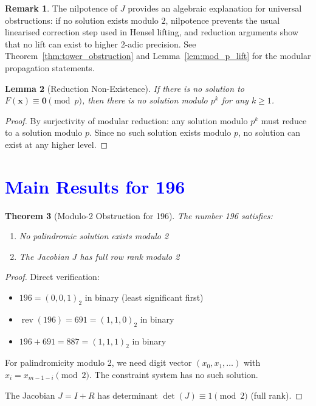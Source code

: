 \documentclass[11pt,a4paper]{article}
\theoremstyle{plain}
\newtheorem{theorem}{Theorem}[section]
\newtheorem{lemma}[theorem]{Lemma}
\theoremstyle{definition}
\newtheorem{remark}[theorem]{Remark}
\DeclareMathOperator{\rev}{rev}
\begin{document}
\begin{remark}
The nilpotence of $J$ provides an algebraic explanation for universal obstructions: if no solution exists modulo $2$, nilpotence prevents the usual linearised correction step used in Hensel lifting, and reduction arguments show that no lift can exist to higher 2-adic precision. See Theorem~\ref{thm:tower_obstruction} and Lemma~\ref{lem:mod_p_lift} for the modular propagation statements.
\end{remark}

\begin{lemma}[Reduction Non-Existence]\label{lem:reduction}
If there is no solution to $F(\mathbf{x}) \equiv \mathbf{0} \pmod{p}$, then there is no solution modulo $p^k$ for any $k \geq 1$.
\end{lemma}

\begin{proof}
By surjectivity of modular reduction: any solution modulo $p^k$ must reduce to a solution modulo $p$. Since no such solution exists modulo $p$, no solution can exist at any higher level.
\end{proof}

\section{\textcolor{blue}{Main Results for 196}}

\begin{theorem}[Modulo-2 Obstruction for 196]\label{thm:mod2_196}
The number 196 satisfies:
\begin{enumerate}
\item No palindromic solution exists modulo 2
\item The Jacobian $J$ has full row rank modulo 2
\end{enumerate}
\end{theorem}

\begin{proof}
Direct verification:
\begin{itemize}
\item $196 = (0, 0, 1)_2$ in binary (least significant first)
\item $\rev(196) = 691 = (1, 1, 0)_2$ in binary
\item $196 + 691 = 887 = (1, 1, 1)_2$ in binary
\end{itemize}

For palindromicity modulo 2, we need digit vector $(x_0, x_1, \ldots)$ with $x_i = x_{m-1-i} \pmod{2}$. The constraint system has no such solution.

The Jacobian $J = I + R$ has determinant $\det(J) \equiv 1 \pmod{2}$ (full rank).
\end{proof}
\end{document}
